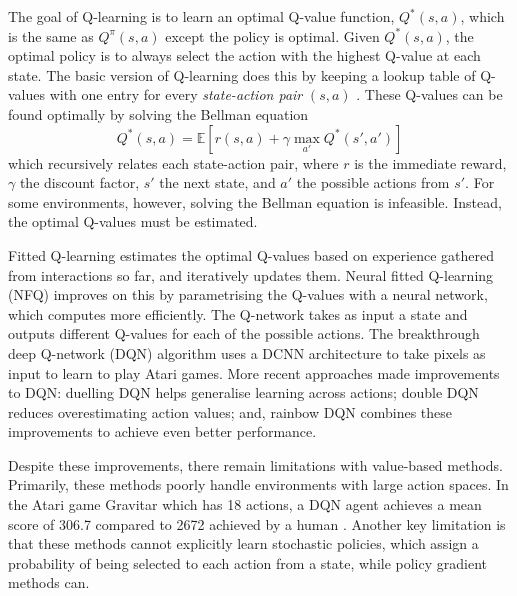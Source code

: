 \documentclass[12pt,a4paper]{article}
\begin{document}
The goal of Q-learning is to learn an optimal Q-value function, $Q^*(s,a)$, which is the same as $Q^{\pi}(s,a)$ except the policy is optimal. Given $Q^*(s,a)$, the optimal policy is to always select the action with the highest Q-value at each state. The basic version of Q-learning does this by keeping a lookup table of Q-values with one entry for every \emph{state-action pair} $(s,a)$ \cite{DBLP:journals/corr/abs-1811-12560}. These Q-values can be found optimally by solving the Bellman equation \cite{R-352-PR} $$Q^*(s,a) = \mathbb{E} \left[{r(s,a) + \gamma \underset{a'}{\max} Q^*(s',a')}\right]$$ which recursively relates each state-action pair, where $r$ is the immediate reward, $\gamma$ the discount factor, $s'$ the next state, and $a'$ the possible actions from $s'$. For some environments, however, solving the Bellman equation is infeasible. Instead, the optimal Q-values must be estimated.

Fitted Q-learning \cite{10.5555/2998828.2998976} estimates the optimal Q-values based on experience gathered from interactions so far, and iteratively updates them. Neural fitted Q-learning (NFQ) \cite{10.1007/11564096_32} improves on this by parametrising the Q-values with a neural network, which computes more efficiently. The Q-network takes as input a state and outputs different Q-values for each of the possible actions. The breakthrough deep Q-network (DQN) algorithm \cite{Mnih2015} uses a DCNN architecture to take pixels as input to learn to play Atari games. More recent approaches made improvements to DQN: duelling DQN \cite{DBLP:journals/corr/WangFL15} helps generalise learning across actions; double DQN \cite{DBLP:journals/corr/HasseltGS15} reduces overestimating action values; and, rainbow DQN \cite{DBLP:journals/corr/abs-1710-02298} combines these improvements to achieve even better performance.

Despite these improvements, there remain limitations with value-based methods. Primarily, these methods poorly handle environments with large action spaces. In the Atari game Gravitar which has 18 actions, a DQN agent achieves a mean score of 306.7 compared to 2672 achieved by a human \cite{Mnih2015}. Another key limitation is that these methods cannot explicitly learn stochastic policies, which assign a probability of being selected to each action from a state, while policy gradient methods can.
\end{document}
